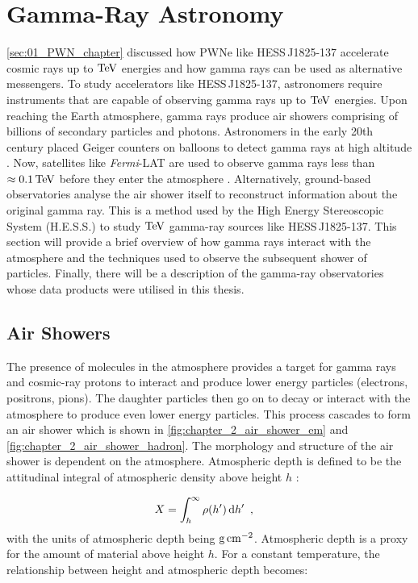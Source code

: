 \chapter{Gamma-Ray Astronomy} \label{sec:02_astronomy}

\autoref{sec:01_PWN_chapter} discussed how PWNe like \mbox{HESS\,J1825-137} accelerate cosmic rays up to $\TeV$ energies and how gamma rays can be used as alternative messengers. To study accelerators like \mbox{HESS\,J1825-137}, astronomers require instruments that are capable of observing gamma rays up to $\TeV$ energies.
\newpar 
Upon reaching the Earth atmosphere, gamma rays produce air showers comprising of billions of secondary particles and photons. Astronomers in the early 20th century placed Geiger counters on balloons to detect gamma rays at high altitude \citep{hess1912observations}. Now, satellites like \textit{Fermi}-LAT are used to observe gamma rays less than $\approx 0.1\,\TeV$ before they enter the atmosphere \citep{2010RPPh...73g4901M}. Alternatively, ground-based observatories analyse the air shower itself to reconstruct information about the original gamma ray. This is a method used by the High Energy Stereoscopic System (H.E.S.S.) to study $\TeV$ gamma-ray sources like \mbox{HESS\,J1825-137}.
\newpar 
This section will provide a brief overview of how gamma rays interact with the atmosphere and the techniques used to observe the subsequent shower of particles. Finally, there will be a description of the gamma-ray observatories whose data products were utilised in this thesis.%

\section{Air Showers}

The presence of molecules in the atmosphere provides a target for gamma rays and cosmic-ray protons to interact and produce lower energy particles (electrons, positrons, pions). The daughter particles then go on to decay or interact with the atmosphere to produce even lower energy particles. This process cascades to form an air shower which is shown in \autoref{fig:chapter_2_air_shower_em} and \autoref{fig:chapter_2_air_shower_hadron}.
\newpar 
The morphology and structure of the air shower is dependent on the atmosphere. Atmospheric depth is defined to be the attitudinal integral of atmospheric density above height $h$ \citep{alma9924446790001811}:

\begin{equation}
    \begin{aligned}
    X&=\int_{h}^\infty \rho\qty(h')\dd{h'}\text{ ,}
    \end{aligned}
\end{equation}
\noindent with the units of atmospheric depth being $\si{\gram\per\centi\meter\squared}$. Atmospheric depth is a proxy for the amount of material above height $h$. For a constant temperature, the relationship between height and atmospheric depth becomes:

